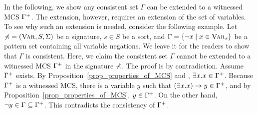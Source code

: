\documentclass{amsart}
\begin{document}
\begin{comment}
The above results show that the nominal extension $\ePattern$
still enjoys expected properties,
even though it
is a restriction of the extended language $\ePattern$ by excluding all patterns
where nominal variables are quantified.
From now on till the end of this section,
let us only consider the nominal extension language $\ePattern$.
We will use $\Gamma, \Delta, \Sigma$ to denote witnessed MCSs
in $\ePattern$ unless we explicitly say otherwise.
We also write $\vdash \varphi$ to denote that $\varphi$ is derivable in 
$\ePattern$, unless we say otherwise.

\end{comment}


In the following, we show any consistent set
$\Gamma$ can be extended to a witnessed MCS
$\Gamma^+$.
The extension, however, requires an extension
of the set of variables.
To see why such an extension is needed, consider
the following example.
Let $\mathbb{\Sigma} = (\textnormal{\textsc{Var}}, S, \Sigma)$ be a signature,
$s \in S$ be a sort,
and 
$\Gamma = \{ \neg x \mid x \in \textnormal{\textsc{Var}}_s \}$
be a pattern set containing all variable negations.
We leave it for the readers to show that $\Gamma$ is consistent.
Here, we claim the consistent set $\Gamma$
cannot be extended to a witnessed MCS $\Gamma^+$ in the signature $\mathbb{\Sigma}$.
The proof is by contradiction.
Assume $\Gamma^+$ exists.
By Proposition~\ref{prop_properties_of_MCS} and \existence,
$\exists x . x \in \Gamma^+$.
Because $\Gamma^+$ is a witnessed MCS,
there is a variable $y$ such that
$(\exists x . x) \to y \in \Gamma^+$, and
by Proposition~\ref{prop_properties_of_MCS}, $y \in \Gamma^+$.
On the other hand, $\neg y \in \Gamma \subseteq \Gamma^+$.
This contradicts the consistency of $\Gamma^+$.
\end{document}
